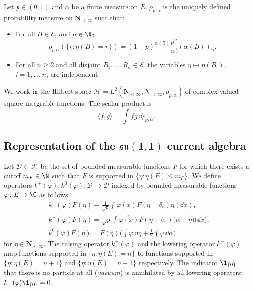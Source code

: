 \begin{Definition}
 Let $p\in (0,1)$ and $\alpha$ be a finite measure on $E$. $\rho_{p,\alpha}$ is the uniquely defined probability measure on $\mathbf N_{<\infty}$ such that:
 \begin{itemize}\itemsep=0pt
 	\item For all $B\in \mathcal E$, and $n\in \N_0$
 	\begin{equation} \label{eq:negbin}
 		\rho_{p,\alpha}(\{\eta\colon \eta(B) =n\}) = (1-p)^{\alpha(B)} \frac{p^n}{n!} (\alpha(B))_{n}.
 	\end{equation}
 	\item For all $n \geq 2$ and all disjoint $B_1,\ldots, B_n\in \mathcal E$, the variables $\eta\mapsto \eta(B_i)$, $i=1,\ldots, n$, are independent.
 \end{itemize}
\end{Definition}

We work in the Hilbert space $\mathcal H = L^2(\mathbf N_{<\infty}, \mathcal N_{<\infty}, \rho_{p,\alpha})$ of complex-valued square-integrable functions. The scalar product is
\[
	\langle f,g \rangle = \int \overline{f} g\, \dd\rho_{p,\alpha}.
\]

\subsection[Representation of the su(1,1)]{Representation of the $\boldsymbol{\mathfrak{su}(1,1)}$ current algebra} \label{sec:su11}

Let $\mathcal D\subset \mathcal H$ be the set of bounded measurable functions $F$ for which there exists a cutoff $ m_F \in \N$ such that $F$ is supported in $\{\eta\colon \eta(E)\leq m_F\}$. We define operators $k^\pm(\varphi),k^0(\varphi)\colon\mathcal D\to \mathcal D$ indexed by bounded measurable functions $\varphi\colon E\to \C$ as follows:
\begin{align*}
	&k^+(\varphi) F(\eta) = \frac{1}{\sqrt p} \int \varphi(x) F(\eta-\delta_x) \eta(\dd x),\\
 &k^-(\varphi) F(\eta) = \sqrt{p} \int \overline{\varphi(x)} F(\eta+\delta_x) \bigl(\alpha+\eta)\bigr(\dd x),\\
	&k^0(\varphi) F(\eta) = F(\eta) \biggl( \int \varphi\,\dd \eta+ \frac12 \int \varphi \,\dd \alpha \biggr).
\end{align*}
for $\eta \in \mathbf{N}_{<\infty}$.
The raising operator $k^+(\varphi)$ and the lowering operator $k^-(\varphi)$ map functions supported in $\{\eta\colon \eta(E) = n\}$ to functions supported in $\{\eta\colon \eta(E) =n+1\}$ and $\{\eta\colon \eta(E) =n-1\}$ respectively. The indicator $\1_{\{0\}}$ that there is no particle at all (\emph{vacuum}) is annihilated by all lowering operators: $k^-(\varphi) \1_{\{0\}}=0$.

